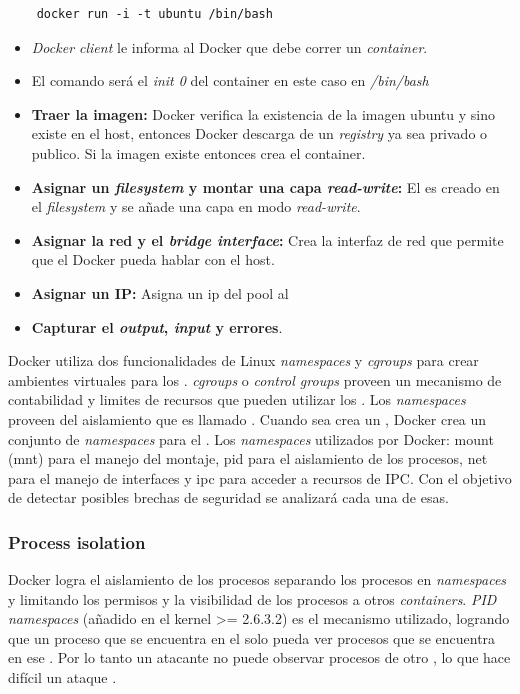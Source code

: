 \documentclass[letter,10pt]{article}
\begin{document}
\begin{verbatim}
	docker run -i -t ubuntu /bin/bash
\end{verbatim}
	\begin{itemize}
		\item \emph{Docker client} le informa al Docker que debe correr un \emph{container}.
		\item El comando será el \textit{init 0} del container en este caso en \emph{/bin/bash}
		\item \textbf{Traer la imagen:} Docker verifica la existencia de la imagen ubuntu y sino existe en el host, entonces Docker descarga de un \emph{registry} ya sea privado o publico. Si la imagen existe entonces crea el container.
		\item \textbf{Asignar un \emph{filesystem} y montar una capa \emph{read-write}:} El 
			\container es creado en el \emph{filesystem} y se añade una capa en modo 
			\emph{read-write}.
		\item \textbf{Asignar la red y el \emph{bridge interface}:} Crea la interfaz de red que permite que el Docker \container pueda hablar con el host.
		\item \textbf{Asignar un IP:} Asigna un ip del pool al \container
		\item \textbf{Capturar el \emph{output}, \emph{input} y errores}.
	\end{itemize}

Docker utiliza dos funcionalidades de Linux \emph{namespaces} y \emph{cgroups} para crear ambientes virtuales para los \containers. \emph{cgroups} o \emph{control groups} proveen un mecanismo de contabilidad y limites de recursos que pueden utilizar los \containers. \cite{bui2015analysis} Los \emph{namespaces} proveen del aislamiento que es llamado \container. Cuando sea crea un \container, Docker crea un conjunto de \emph{namespaces} para el \container. Los \emph{namespaces} utilizados por Docker: mount (mnt) para el manejo del montaje, pid para el aislamiento de los procesos, net para el manejo de interfaces y ipc para acceder a recursos de IPC. 
	Con el objetivo de detectar posibles brechas de seguridad se analizará cada una de esas.
	
	
	\subsubsection{Process isolation}
	
	Docker logra el aislamiento de los procesos separando los procesos en \emph{namespaces} y limitando los permisos y la visibilidad de los procesos a otros \emph{containers}. \emph{PID namespaces} (añadido en el kernel >= 2.6.3.2) es el mecanismo utilizado, logrando que un proceso que se encuentra en el \container solo pueda ver procesos que se encuentra en ese \container. Por lo tanto un atacante no puede observar procesos de otro \container, lo que hace difícil un ataque \cite{bui2015analysis} \cite{LVM:2015:Online}.
	
\end{document}
